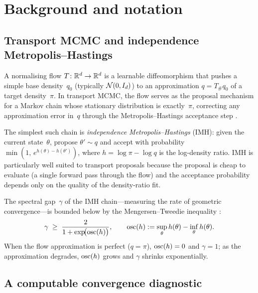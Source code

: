 %  

\section{Background and notation}
\label{sec:background}


\subsection{Transport MCMC and independence Metropolis--Hastings}
\label{sec:bg_transport}

A normalising flow $T\colon \mathbb{R}^d \to \mathbb{R}^d$ is a learnable
diffeomorphism that pushes a simple base density~$q_0$
(typically $\mathcal{N}(0, I_d)$) to an approximation
$q = T_{\#}q_0$ of a target density~$\pi$.
In transport MCMC, the flow serves as the proposal mechanism
for a Markov chain whose stationary distribution is
exactly~$\pi$, correcting any approximation error in~$q$
through the Metropolis--Hastings acceptance step
\citep{Parno2018,Hoffman2019,Gabrie2022}.

The simplest such chain is \emph{independence
Metropolis--Hastings} (IMH): given the current state~$\theta$,
propose $\theta' \sim q$ and accept with probability
$\min(1,\, e^{h(\theta) - h(\theta')})$, where
$h = \log\pi - \log q$ is the log-density ratio.
IMH is particularly well suited to transport proposals because
the proposal is cheap to evaluate (a single forward pass through
the flow) and the acceptance probability depends only on the
quality of the density-ratio fit.

The spectral gap~$\gamma$ of the IMH chain---measuring the
rate of geometric convergence---is bounded below by the
Mengersen--Tweedie inequality \citep{MengersenTweedie1996}:
\begin{equation}\label{eq:mt_bound}
  \gamma
  \;\geq\;
  \frac{2}{1 + \exp\!\bigl(\mathrm{osc}(h)\bigr)},
  \qquad
  \mathrm{osc}(h)
  := \sup_\theta h(\theta) - \inf_\theta h(\theta).
\end{equation}
When the flow approximation is perfect ($q = \pi$),
$\mathrm{osc}(h) = 0$ and $\gamma = 1$; as the approximation degrades,
$\mathrm{osc}(h)$ grows and $\gamma$ shrinks exponentially.


\subsection{A computable convergence diagnostic}
\label{sec:bg_lcnf}

